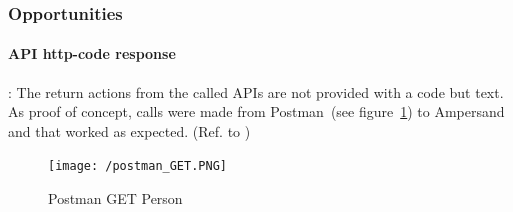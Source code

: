 \subsubsection{Opportunities}\label{subsub:4_opportunities}


\paragraph{\textbf{API http-code response}}\label{swot:o_api_http_responsecode}:
The return actions from the called APIs are not provided with a code but text.
As proof of concept, calls were made from Postman~(see figure~\ref{fig:postman-get-person}) to Ampersand and that worked as expected.
(Ref. to )
\begin{figure}[ht]
    \centering
    \texttt{[image: /postman\_GET.PNG]}
    \caption{Postman GET Person}
    \label{fig:postman-get-person}
\end{figure}

